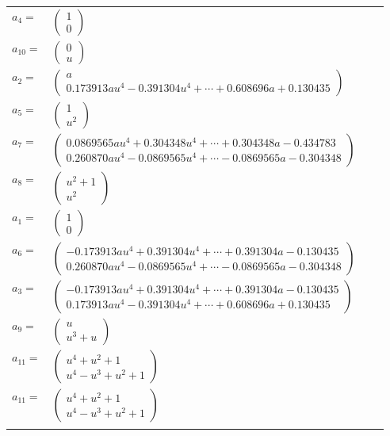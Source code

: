 \documentclass[1p]{elsarticle_modified}
\theoremstyle{definition}
\begin{document}
\begin{tabular}{m{7pt} m{180pt} m{7pt} m{180pt} }
\flushright $a_{4}=$&$\begin{pmatrix}1\\0\end{pmatrix}$ \\
\flushright $a_{10}=$&$\begin{pmatrix}0\\u\end{pmatrix}$ \\
\flushright $a_{2}=$&$\begin{pmatrix}a\\0.173913 a u^{4}-0.391304 u^{4}+\cdots+0.608696 a+0.130435\end{pmatrix}$ \\
\flushright $a_{5}=$&$\begin{pmatrix}1\\u^2\end{pmatrix}$ \\
\flushright $a_{7}=$&$\begin{pmatrix}0.0869565 a u^{4}+0.304348 u^{4}+\cdots+0.304348 a-0.434783\\0.260870 a u^{4}-0.0869565 u^{4}+\cdots-0.0869565 a-0.304348\end{pmatrix}$ \\
\flushright $a_{8}=$&$\begin{pmatrix}u^2+1\\u^2\end{pmatrix}$ \\
\flushright $a_{1}=$&$\begin{pmatrix}1\\0\end{pmatrix}$ \\
\flushright $a_{6}=$&$\begin{pmatrix}-0.173913 a u^{4}+0.391304 u^{4}+\cdots+0.391304 a-0.130435\\0.260870 a u^{4}-0.0869565 u^{4}+\cdots-0.0869565 a-0.304348\end{pmatrix}$ \\
\flushright $a_{3}=$&$\begin{pmatrix}-0.173913 a u^{4}+0.391304 u^{4}+\cdots+0.391304 a-0.130435\\0.173913 a u^{4}-0.391304 u^{4}+\cdots+0.608696 a+0.130435\end{pmatrix}$ \\
\flushright $a_{9}=$&$\begin{pmatrix}u\\u^3+u\end{pmatrix}$ \\
\flushright $a_{11}=$&$\begin{pmatrix}u^4+u^2+1\\u^4- u^3+u^2+1\end{pmatrix}$\\ \flushright $a_{11}=$&$\begin{pmatrix}u^4+u^2+1\\u^4- u^3+u^2+1\end{pmatrix}$\\&\end{tabular}
\end{document}
